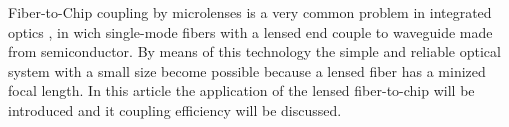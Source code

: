 
Fiber-to-Chip coupling by microlenses is a very common problem in integrated optics \cite{ integrated_optics}, in wich single-mode fibers with a lensed end couple to waveguide made from semiconductor. By means of this technology the simple and reliable optical system with a small size become possible because a lensed fiber has a minized focal length. In this article the application of the lensed fiber-to-chip will be introduced and it coupling efficiency will be discussed.
